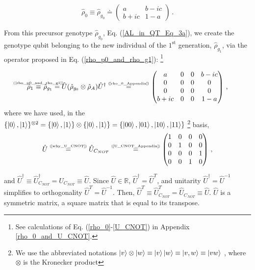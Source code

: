 \documentclass[11pt]{article}
\numberwithin{equation}{section} %
\numberwithin{figure}{section} %
\newcommand\numeq[1] %
  {\stackrel{\scriptscriptstyle(\mkern-1.5mu#1\mkern-1.5mu)}{=}}
\begin{document}
\begin{equation} \label{AL_in_QT_Eq_3a}
\hat{\rho}_0\equiv\hat{\rho}_{g_0}\doteq\begin{pmatrix}a&b-ic\\b+ic&1-a\end{pmatrix}\,\textrm{.}
\end{equation}

From  this precursor genotype $\hat{\rho}_{g_0}$, Eq. (\ref{AL_in_QT_Eq_3a}), we create the genotype qubit belonging to the new individual of the $1^\textrm{st}$ generation, $\hat{\rho}_{g_1}$, via the operator proposed in Eq. (\ref{rho_p0_and_rho_g1}): \footnote{See calculations of Eq. (\ref{rho_0}-\ref{U_CNOT}) in Appendix \ref{rho_0_and_U_CNOT}.}

\begin{equation} \label{rho_0}
\hat{\rho}_1   \,\,\newcommand\myeq1{\mathrel{\stackrel{\makebox[0pt]{\mbox{\normalfont\tiny \textrm{(\ref{rho_p0_and_rho_g1})}}}}{\equiv}}}\,\,    \hat{\rho}_{g_1}=\hat{U}(\hat{\rho}_{g_0}\otimes\hat{\rho}_A)\hat{U}^\dagger\numeq{\textrm{\ref{rho_0_Appendix}}}\begin{pmatrix}a&0&0&b-ic\\0&0&0&0\\0&0&0&0\\b+ic&0&0&1-a\end{pmatrix}
\,\textrm{,}
\end{equation}
where we have used, in the $\{\ket{0},\ket{1}\}^{\otimes 2}=\{\ket{0},\ket{1}\}\otimes\{\ket{0},\ket{1}\}=\{\ket{00},\ket{01},\ket{10},\ket{11}\}$ \footnote{We use the abbreviated notations $\ket{v}\otimes\ket{w}\equiv \ket{v}\ket{w} \equiv \ket{v,w}\equiv \ket{vw}$ \cite[p.~72, l.~33]{Nielsen}, where $\otimes$ is the Kronecker product} basis, $\,\,\,$ \cite[p.~xxxi, l.~1]{Nielsen}
\begin{equation} \label{U_CNOT}
\hat{U}
\numeq{\textrm{\ref{why_U_CNOT}}}\hat{U}_{C_{NOT}}\numeq{\textrm{\ref{U_CNOT_Appendix}}}\begin{pmatrix}1&0&0&0\\0&1&0&0\\0&0&0&1\\0&0&1&0\end{pmatrix}\,\textrm{,}
\end{equation}

and $\hat{U}^\dagger\equiv\hat{U}_{C_{NOT}}^\dagger=\hat{U}_{C_{NOT}}\equiv\hat{U}$. Since $\hat{U}\in\mathbb{R}$, $\hat{U}^\dagger=\hat{U}^T$, and unitarity $\hat{U}^\dagger=\hat{U}^{-1}$ simplifies to orthogonality $\hat{U}^T=\hat{U}^{-1}$. Then, $\hat{U}^T\equiv\hat{U}_{C_{NOT}}^T=\hat{U}_{C_{NOT}}\equiv\hat{U}$. $\hat{U}$ is  a symmetric matrix, a square matrix that is equal to its transpose.
\end{document}
